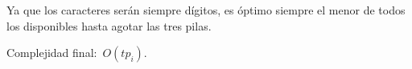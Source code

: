 
Ya que los caracteres serán siempre dígitos, es óptimo siempre el menor de todos los
disponibles hasta agotar las tres pilas.

Complejidad final:~$O(tp_i)$.

